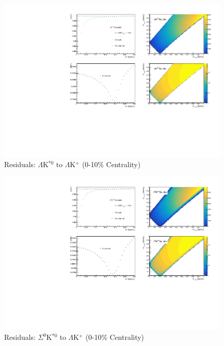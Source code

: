 \documentclass[/home/jesse/Analysis/FemtoAnalysis/AnalysisNotes/AnalysisNoteJBuxton.tex]{subfiles}
\begin{document}
\begin{figure}[h]
  \centering
  \includegraphics[width=\textwidth]{9_AdditionalFigures/Figures/Residuals/LamKchP/Residuals_LamKchP_0010_LamKSt0_MomResCrctn_NonFlatBgdCrctn_10Res_PrimMaxDecay4fm_UsingXiDataAndCoulombOnly.pdf}
  \caption[Residuals: $\Lambda$K$^{*0}$ to $\Lambda$K$^{+}$ (0-10\% Centrality)]{Residuals: $\Lambda$K$^{*0}$ to $\Lambda$K$^{+}$ (0-10\% Centrality)}
  \label{fig:Res_LamKchP_0010_LamKSt0}
\end{figure}


\begin{figure}[h]
  \centering
  \includegraphics[width=\textwidth]{9_AdditionalFigures/Figures/Residuals/LamKchP/Residuals_LamKchP_0010_Sig0KSt0_MomResCrctn_NonFlatBgdCrctn_10Res_PrimMaxDecay4fm_UsingXiDataAndCoulombOnly.pdf}
  \caption[Residuals: $\Sigma^{0}$K$^{*0}$ to $\Lambda$K$^{+}$ (0-10\% Centrality)]{Residuals: $\Sigma^{0}$K$^{*0}$ to $\Lambda$K$^{+}$ (0-10\% Centrality)}
  \label{fig:Res_LamKchP_0010_Sig0KSt0}
\end{figure}
\end{document}
